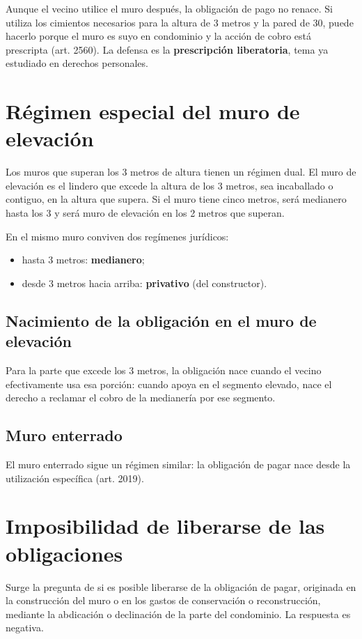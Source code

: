\documentclass[12pt,oneside]{book}
\begin{document}
Aunque el vecino utilice el muro después, la obligación de pago no renace. Si utiliza los cimientos necesarios para la altura de 3 metros y la pared de 30, puede hacerlo porque el muro es suyo en condominio y la acción de cobro está prescripta (art. 2560). La defensa es la \textbf{prescripción liberatoria}, tema ya estudiado en derechos personales.

\section{Régimen especial del muro de elevación}

Los muros que superan los 3 metros de altura tienen un régimen dual. El muro de elevación es el lindero que excede la altura de los 3 metros, sea incaballado o contiguo, en la altura que supera. Si el muro tiene cinco metros, será medianero hasta los 3 y será muro de elevación en los 2 metros que superan.

En el mismo muro conviven dos regímenes jurídicos:

\begin{itemize}
\item hasta 3 metros: \textbf{medianero};
\item desde 3 metros hacia arriba: \textbf{privativo} (del constructor).
\end{itemize}

\subsection{Nacimiento de la obligación en el muro de elevación}

Para la parte que excede los 3 metros, la obligación nace cuando el vecino efectivamente usa esa porción: cuando apoya en el segmento elevado, nace el derecho a reclamar el cobro de la medianería por ese segmento.

\subsection{Muro enterrado}

El muro enterrado sigue un régimen similar: la obligación de pagar nace desde la utilización específica (art. 2019).

\section{Imposibilidad de liberarse de las obligaciones}

Surge la pregunta de si es posible liberarse de la obligación de pagar, originada en la construcción del muro o en los gastos de conservación o reconstrucción, mediante la abdicación o declinación de la parte del condominio. La respuesta es negativa.
\end{document}
